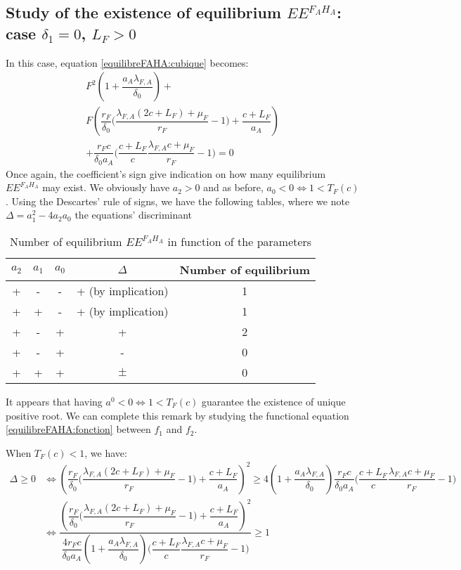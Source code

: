 \documentclass{article}
\newcommand{\lfa}{\lambda_{F, A}}
\begin{document}
\begin{appendices}
\subsection{Study of the existence of equilibrium $EE^{F_AH_A}$: case $\delta_1 = 0$, $L_F > 0$}
In this case, equation \eqref{equilibreFAHA:cubique} becomes:
\begin{multline}
F^2 \left(1 + \dfrac{a_A \lfa}{\delta_0}\right) + \\
F \left(\dfrac{r_F}{\delta_0}\Big(\dfrac{\lfa(2c+L_F) + \mu_F}{r_F} - 1\Big) + \dfrac{c+ L_F}{a_A}  \right) \\
 + \dfrac{r_Fc}{\delta_0 a_A} \Big(\dfrac{c+L_F}{c} \dfrac{\lfa c + \mu_F}{r_F} - 1\Big) = 0
\label{equilibreFAHA:quadratic}
\end{multline}
Once again, the coefficient's sign give indication on how many equilibrium $EE^{F_AH_A}$ may exist.
We obviously have $a_2 > 0$ and as before, $a_0 < 0 \Leftrightarrow 1 < T_F(c)$.
Using the Descartes' rule of signs, we have the following tables, where we note $\Delta = a_1^2 - 4a_2a_0$ the equations' discriminant

\begin{table}[!ht]
\caption{Number of equilibrium $EE^{F_AH_A}$ in function of the parameters}
\centering
\begin{tabular}{c|c|c|c|c}
$a_2$ & $a_1$ & $a_0$ & $\Delta$ & Number of equilibrium \\
\hline
+ & - & - & + (by implication) &1 \\
+ & + & - & + (by implication) &1 \\
+ & - & + & + & 2 \\
+ & - & + & - & 0 \\
+ & + & + & $\pm$ & 0
\end{tabular}
\end{table}

It appears that having $a^0 < 0 \Leftrightarrow 1 < T_F(c)$ guarantee the existence of unique positive root. We can complete this remark by studying the functional equation \eqref{equilibreFAHA:fonction} between $f_1$ and $f_2$.

When $T_F(c) < 1$, we have:
\begin{align*}
\Delta \geq 0 &\Leftrightarrow \left(\dfrac{r_F}{\delta_0}\Big(\dfrac{\lfa(2c+L_F) + \mu_F}{r_F} - 1\Big) + \dfrac{c+ L_F}{a_A}  \right)^ 2 \geq 4 \left(1 + \dfrac{a_A \lfa}{\delta_0}\right)\dfrac{r_Fc}{\delta_0 a_A} \Big(\dfrac{c+L_F}{c} \dfrac{\lfa c + \mu_F}{r_F} - 1\Big) \\
& \Leftrightarrow \dfrac{\left(\dfrac{r_F}{\delta_0}\Big(\dfrac{\lfa(2c+L_F) + \mu_F}{r_F} - 1\Big) + \dfrac{c+ L_F}{a_A}  \right)^ 2}{\dfrac{4 r_Fc}{\delta_0 a_A}\left(1 + \dfrac{a_A \lfa}{\delta_0}\right) \Big(\dfrac{c+L_F}{c} \dfrac{\lfa c + \mu_F}{r_F} - 1\Big)} \geq 1
\end{align*}



\end{appendices}
\end{document}
